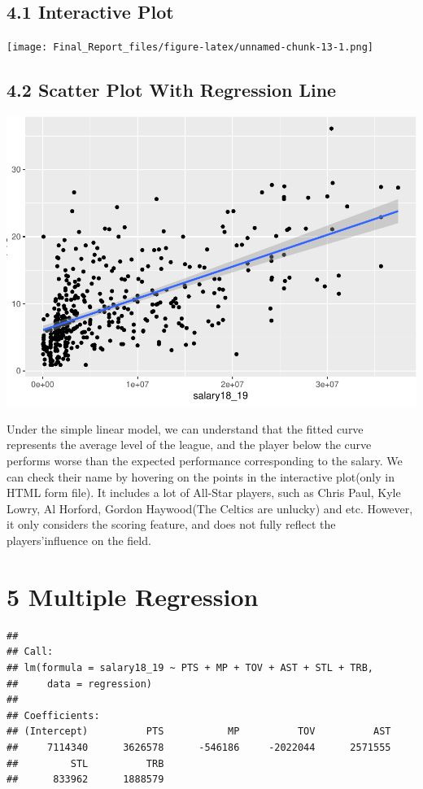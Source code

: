 \documentclass[]{article}
\begin{document}
\subsection{4.1 Interactive Plot}\label{interactive-plot}

\texttt{[image: Final\_Report\_files/figure-latex/unnamed-chunk-13-1.png]}

\subsection{4.2 Scatter Plot With Regression
Line}\label{scatter-plot-with-regression-line}

\includegraphics{Final_Report_files/figure-latex/unnamed-chunk-14-1.pdf}

Under the simple linear model, we can understand that the fitted curve
represents the average level of the league, and the player below the
curve performs worse than the expected performance corresponding to the
salary. We can check their name by hovering on the points in the
interactive plot(only in HTML form file). It includes a lot of All-Star
players, such as Chris Paul, Kyle Lowry, Al Horford, Gordon Haywood(The
Celtics are unlucky) and etc. However, it only considers the scoring
feature, and does not fully reflect the players'influence on the field.

\section{5 Multiple Regression}\label{multiple-regression}

\begin{verbatim}
## 
## Call:
## lm(formula = salary18_19 ~ PTS + MP + TOV + AST + STL + TRB, 
##     data = regression)
## 
## Coefficients:
## (Intercept)          PTS           MP          TOV          AST  
##     7114340      3626578      -546186     -2022044      2571555  
##         STL          TRB  
##      833962      1888579
\end{verbatim}
\end{document}
